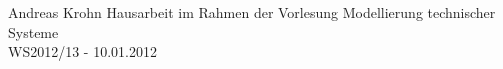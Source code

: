 
\date{\today}


{Andreas Krohn} %
{Hausarbeit im Rahmen der Vorlesung Modellierung technischer Systeme\\
WS2012/13 - 10.01.2012} %

% 

\tableofcontents %









